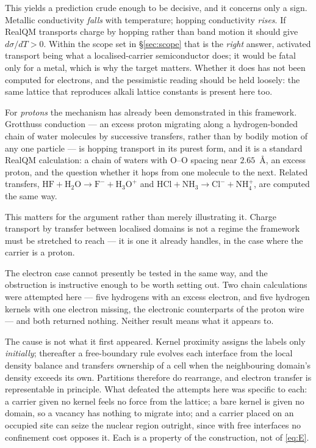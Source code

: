 \documentclass[11pt]{article}
\begin{document}
This yields a prediction crude enough to be decisive, and it concerns only a sign. Metallic
conductivity \emph{falls} with temperature; hopping conductivity \emph{rises}. If RealQM transports
charge by hopping rather than band motion it should give $d\sigma/dT>0$. Within the scope set in
\S\ref{sec:scope} that is the \emph{right} answer, activated transport being what a localised-carrier
semiconductor does; it would be fatal only for a metal, which is why the target matters. Whether it does has not been computed for electrons, and the
pessimistic reading should be held loosely: the same lattice that reproduces alkali lattice constants is
present here too.

For \emph{protons} the mechanism has already been demonstrated in this framework. Grotthuss
conduction --- an excess proton migrating along a hydrogen-bonded chain of water molecules by
successive transfers, rather than by bodily motion of any one particle --- is hopping transport in
its purest form, and it is a standard RealQM calculation: a chain of waters with $\mathrm{O}$--$\mathrm{O}$
spacing near $2.65$~\AA{}, an excess proton, and the question whether it hops from one molecule to
the next. Related transfers, $\mathrm{HF}+\mathrm{H_2O}\to\mathrm{F^-}+\mathrm{H_3O^+}$ and
$\mathrm{HCl}+\mathrm{NH_3}\to\mathrm{Cl^-}+\mathrm{NH_4^+}$, are computed the same way.

This matters for the argument rather than merely illustrating it. Charge transport by transfer
between localised domains is not a regime the framework must be stretched to reach --- it is one it
already handles, in the case where the carrier is a proton.

The electron case cannot presently be tested in the same way, and the obstruction is instructive
enough to be worth setting out. Two chain calculations were attempted here --- five hydrogens with an
excess electron, and five hydrogen kernels with one electron missing, the electronic counterparts of
the proton wire --- and both returned nothing. Neither result means what it appears to.

The cause is not what it first appeared. Kernel proximity assigns the labels only \emph{initially};
thereafter a free-boundary rule evolves each interface from the local density balance and transfers
ownership of a cell when the neighbouring domain's density exceeds its own. Partitions therefore do
rearrange, and electron transfer is representable in principle. What defeated the attempts here was
specific to each: a carrier given no kernel feels no force from the lattice; a bare kernel is given no
domain, so a vacancy has nothing to migrate into; and a carrier placed on an occupied site can seize
the nuclear region outright, since with free interfaces no confinement cost opposes it. Each is a
property of the construction, not of \eqref{eq:E}.
\end{document}
